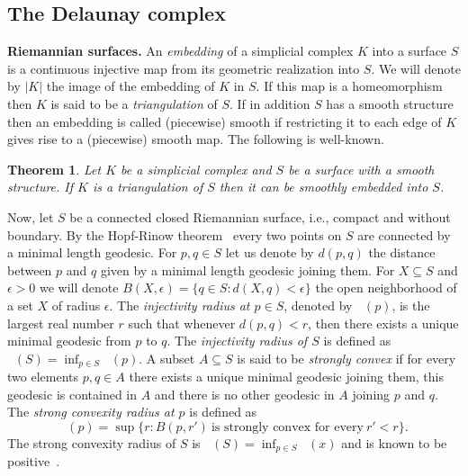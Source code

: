 \documentclass[reqno,english]{amsart}
\newtheorem{theorem}{Theorem}
\numberwithin{claimcounter}{theorem}
\theoremstyle{remark}
\theoremstyle{definition}
\numberwithin{theorem}{section}
\DeclareMathOperator{\rinj}{r_{inj}}
\DeclareMathOperator{\rscv}{r_{scv}}
\begin{document}
\subsection{The Delaunay complex}
\noindent
{\bf Riemannian surfaces.}
An \emph{embedding} of a simplicial complex $K$ into a surface $S$ is a continuous injective map from its geometric realization into $S$. We will denote by $|K|$ the image of the embedding of $K$ in $S$. If this map is a homeomorphism then $K$ is said to be a \emph{triangulation} of $S$. If in addition $S$ has a smooth structure then an embedding is called (piecewise) smooth if restricting it to each edge of $K$ gives rise to a (piecewise) smooth map.
The following is well-known.
\begin{theorem}{\cite{hatcher13-triangsurf}}
\label{t:smooth-emb}
Let $K$ be a simplicial complex and $S$ be a surface with a smooth structure. If $K$ is a triangulation of $S$ then it can be smoothly embedded into $S$.
\end{theorem}

Now, let $S$ be a connected closed Riemannian surface, i.e., compact and without boundary. By the Hopf-Rinow theorem~\cite{docarmo92-riemannian} every two points on $S$ are connected by a minimal length geodesic. For $p,q\in S$ let us denote by $d(p,q)$ the distance between $p$ and $q$ given by a minimal length geodesic joining them.
For $X\subseteq S$ and $\epsilon >0$ we will denote $B(X,\epsilon) = \{q\in S \colon d(X,q)<\epsilon \}$ the open neighborhood of a set $X$ of radius $\epsilon$.
The \emph{injectivity radius at $p\in S$}, denoted by $\rinj(p)$,
is the largest real number $r$ such that whenever $d(p,q)<r$, then there exists
a unique minimal geodesic from $p$ to $q$. The \emph{injectivity radius of $S$} is defined as $\rinj(S) = \inf_{p\in S} \rinj(p)$.
A subset $A\subseteq S$ is said to be \emph{strongly convex} if for every two elements $p,q\in A$ there exists a unique minimal geodesic joining them, this geodesic is contained in $A$ and there is no other geodesic in $A$ joining $p$ and $q$. 
The \emph{strong convexity radius at $p$} is defined as $$\rscv(p) = \sup \{r \colon B(p,r')~\text{is strongly convex for every}~r' < r \}.$$
The strong convexity radius of $S$ is $\rscv(S) = \inf_{p\in S}\rscv(x)$ and is known to be positive~\cite[1.9.9]{klingenberg95-riemannian}.
\end{document}
